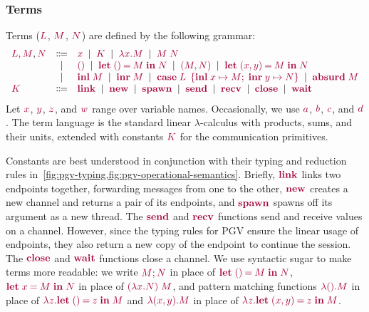 \documentclass[main.tex]{subfiles}
\begin{document}
\subsubsection*{Terms}
Terms ($\tm{L}$, $\tm{M}$, $\tm{N}$) are defined by the following grammar:
\[
\begin{array}{lcl}
  \tm{L}, \tm{M}, \tm{N}
  & \Coloneqq & \tm{x}
    \sep        \tm{K}
    \sep        \tm{\lambda x.M}
    \sep        \tm{M\;N} \\
  & \sep      & \tm{\unit}
    \sep        \tm{\letunit{M}{N}}
    \sep        \tm{\pair{M}{N}}
    \sep        \tm{\letpair{x}{y}{M}{N}} \\
  & \sep      & \tm{\inl{M}}
    \sep        \tm{\inr{M}}
    \sep        \tm{\casesum{L}{x}{M}{y}{N}}
    \sep        \tm{\absurd{M}} \\
  \tm{K}
  & \Coloneqq & \tm{\link}
    \sep        \tm{\new}
    \sep        \tm{\spawn}
    \sep        \tm{\send}
    \sep        \tm{\recv}
    \sep        \tm{\close}
    \sep        \tm{\wait}
\end{array}
\]
Let $\tm{x}$, $\tm{y}$, $\tm{z}$, and $\tm{w}$ range over variable names. Occasionally, we use $\tm{a}$, $\tm{b}$, $\tm{c}$, and $\tm{d}$. The term language is the standard linear $\lambda$-calculus with products, sums, and their units, extended with constants $\tm{K}$ for the communication primitives. 

Constants are best understood in conjunction with their typing and reduction rules in~\cref{fig:pgv-typing,fig:pgv-operational-semantics}. Briefly, $\tm{\link}$ links two endpoints together, forwarding messages from one to the other, $\tm{\new}$ creates a new channel and returns a pair of its endpoints, and $\tm{\spawn}$ spawns off its argument as a new thread. The $\tm{\send}$ and $\tm{\recv}$ functions send and receive values on a channel. However, since the typing rules for PGV ensure the linear usage of endpoints, they also return a new copy of the endpoint to continue the session. The $\tm{\close}$ and $\tm{\wait}$ functions close a channel.
We use syntactic sugar to make terms more readable: we write $\tm{\andthen{M}{N}}$ in place of $\tm{\letunit{M}{N}}$, $\tm{\letbind{x}{M}{N}}$ in place of $\tm{(\lambda x.N)\;M}$, and pattern matching functions $\tm{\lambda\unit.M}$ in place of $\tm{\lambda z.\letunit{z}{M}}$ and $\tm{\lambda\pair{x}{y}.M}$ in place of $\tm{\lambda z.\letpair{x}{y}{z}{M}}$.
\end{document}
